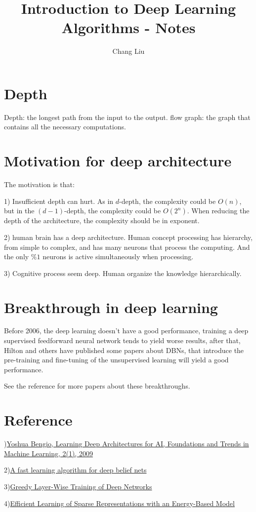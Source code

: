 \documentclass{article}
\title{Introduction to Deep Learning Algorithms \-- Notes}
\author{Chang Liu}
\begin{document}
\maketitle

\section{Depth}
Depth: the longest path from the input to the output.
flow graph: the graph that contains all the necessary computations.


\section{Motivation for deep architecture}
The motivation is that:

1) Insufficient depth can hurt. As in $d$-depth, the complexity could be $O(n)$, but in the $(d-1)$-depth, the complexity could be $O(2^n)$. When reducing the depth of the architecture, the complexity should be in exponent.

2) human brain has a deep architecture. Human concept processing has hierarchy, from simple to complex, and has many neurons that process the computing. And the only $\%1$ neurons is active simultaneously when processing.

3) Cognitive process seem deep. Human organize the knowledge hierarchically. 

\section{Breakthrough in deep learning}

Before 2006, the deep learning doesn't have a good performance, training a deep supervised feedforward neural network tends to yield worse results, after that, Hilton and others have published some papers about DBNs, that introduce the pre-training and fine-tuning of the unsupervised learning will yield a good performance.

See the reference for more papers about these breakthroughs.


\section{Reference}

)\href{http://www.iro.umontreal.ca/~lisa/publications2/index.php/publications/show/239}{Yoshua Bengio, Learning Deep Architectures for AI, Foundations and Trends in Machine Learning, 2(1), 2009}

2)\href{http://www.cs.toronto.edu/~hinton/absps/fastnc.pdf}{A fast learning algorithm for deep belief nets}

3)\href{http://www.iro.umontreal.ca/~lisa/publications2/index.php/publications/show/190}{Greedy Layer-Wise Training of Deep Networks}

4)\href{http://yann.lecun.com/exdb/publis/pdf/ranzato-06.pdf}{Efficient Learning of Sparse Representations with an Energy-Based Model}
\end{document}
